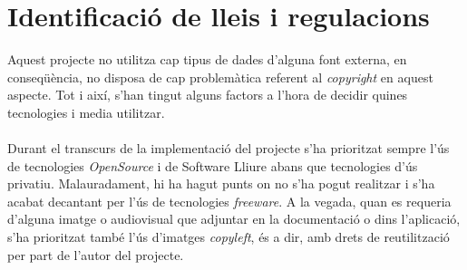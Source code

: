 
\chapter{Identificació de lleis i regulacions} %

\label{Chapter5} %

Aquest projecte no utilitza cap tipus de dades d'alguna font externa, en conseqüència, no disposa de cap problemàtica referent al \textit{copyright}\cite{copyright} en aquest aspecte. Tot i així, s'han tingut alguns factors a l'hora de decidir quines tecnologies i media utilitzar.
\\\\
Durant el transcurs de la implementació del projecte s'ha prioritzat sempre l'ús de tecnologies \textit{OpenSource}\cite{opensource} i de Software Lliure abans que tecnologies d'ús privatiu. Malauradament, hi ha hagut punts on no s'ha pogut realitzar i s'ha acabat decantant per l'ús de tecnologies \textit{freeware}\cite{freeware}. A la vegada, quan es requeria d'alguna imatge o audiovisual que adjuntar en la documentació o dins l'aplicació, s'ha prioritzat també l'ús d'imatges \textit{copyleft}\cite{copyleft}, és a dir, amb drets de reutilització per part de l'autor del projecte.